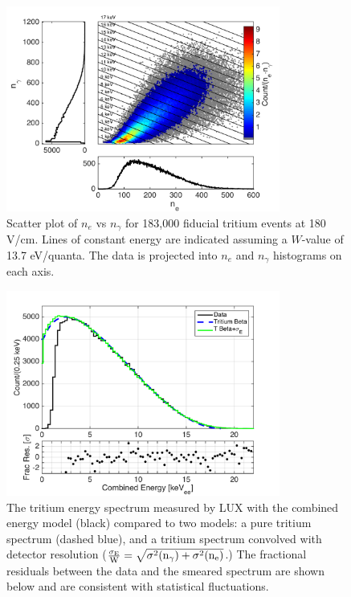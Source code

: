 \begin{figure}[h!]\centering
\includegraphics[width=90mm]{fig/tritium_scatter.png}
\caption{Scatter plot of $n_e$ vs $n_{\gamma}$ for  183,000 fiducial tritium events at 180 V/cm. Lines of constant energy are indicated assuming a $W$-value of 13.7 eV/quanta. The data is projected into $n_e$ and $n_{\gamma}$ histograms on each axis.}
\label{fig:tritium-scatter}
\end{figure}


\begin{figure}[h!]
\begin{center}
\includegraphics[width=90mm]{fig/tritium-spectrum-linear.png}
\caption{The tritium energy spectrum measured by LUX with the combined energy model (black) compared to two models: a pure tritium spectrum (dashed blue), and a tritium spectrum convolved with detector resolution  ($\rm \frac{\sigma_E}{W} = \sqrt{\sigma^2(n_{\gamma})+ \sigma^2(n_e)}$.) The fractional residuals between the data and the smeared spectrum are shown below and are consistent with statistical fluctuations. }
\label{fig:tritium-spectrum}
\end{center}
\end{figure}

